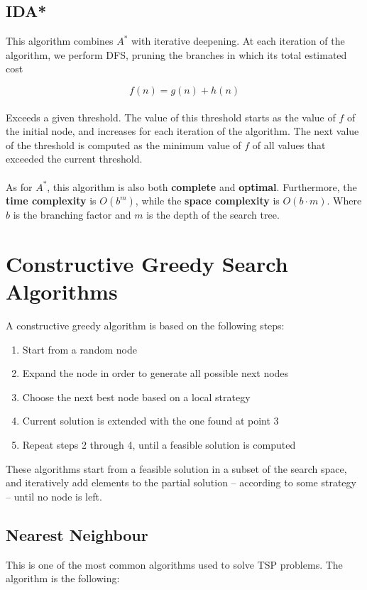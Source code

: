 \documentclass{article}
\begin{document}
\subsection{IDA*}
This algorithm combines $A^*$ with iterative deepening. At each iteration of the algorithm, we perform DFS, pruning the branches in which its total estimated cost

\[ f(n) = g(n) + h(n) \] \\
Exceeds a given threshold. The value of this threshold starts as the value of $f$ of the initial node, and increases for each iteration of the algorithm. The next value of the threshold is computed as the minimum value of $f$ of all values that exceeded the current threshold. \\ \\
As for $A^*$, this algorithm is also both \textbf{complete} and \textbf{optimal}. Furthermore, the \textbf{time complexity} is $O(b^m)$, while the \textbf{space complexity} is $O(b \cdot m)$. Where $b$ is the branching factor and $m$ is the depth of the search tree.

\section{Constructive Greedy Search Algorithms}
A constructive greedy algorithm is based on the following steps:

\begin{enumerate}
	\item Start from a random node
	\item Expand the node in order to generate all possible next nodes
	\item Choose the next best node based on a local strategy
	\item Current solution is extended with the one found at point 3
	\item Repeat steps 2 through 4, until a feasible solution is computed
\end{enumerate}
These algorithms start from a feasible solution in a subset of the search space, and iteratively add elements to the partial solution -- according to some strategy -- until no node is left.

\subsection{Nearest Neighbour}
This is one of the most common algorithms used to solve TSP problems. The algorithm is the following:
\end{document}
